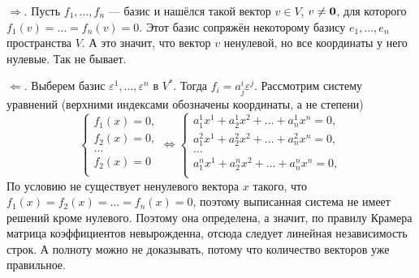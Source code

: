 \begin{solution}
    $\Rightarrow$. Пусть $f_1, \ldots, f_n$ --- базис и нашёлся такой вектор $v \in V$, $v \ne \boldsymbol{0}$, для которого $f_1(v) = \ldots = f_n(v) = 0$. Этот базис сопряжён некоторому базису $e_1, \ldots, e_n$ пространства $V$. А это значит, что вектор $v$ ненулевой, но все координаты у него нулевые. Так не бывает.

    $\Leftarrow$. Выберем базис $\varepsilon^1, \ldots, \varepsilon^n$ в $V^\ast$. Тогда $f_i = a^i_j\varepsilon^j$. Рассмотрим систему уравнений (верхними индексами обозначены координаты, а не степени)
    \[
        \begin{cases}
            f_1(x) = 0,\\
            f_2(x) = 0,\\
            \ldots\\
            f_2(x) = 0\\
        \end{cases} \Leftrightarrow
        \begin{cases}
            a^1_1x^1 + a^1_2x^2 + \ldots + a^1_nx^n = 0,\\
            a^2_1x^1 + a^2_2x^2 + \ldots + a^2_nx^n = 0,\\
            \ldots\\
            a^n_1x^1 + a^n_2x^2 + \ldots + a^n_nx^n = 0,\\
        \end{cases}
    \]
    По условию не существует ненулевого вектора $x$ такого, что $f_1(x) = f_2(x) = \ldots = f_n(x) = 0$, поэтому выписанная система не имеет решений кроме нулевого. Поэтому она определена, а значит, по правилу Крамера матрица коэффициентов невырожденна, отсюда следует линейная независимость строк. А полноту можно не доказывать, потому что количество векторов уже правильное.
\end{solution}

